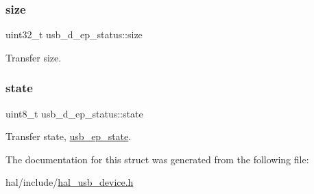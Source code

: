 \subsubsection{\texorpdfstring{size}{size}}
{\footnotesize\ttfamily uint32\+\_\+t usb\+\_\+d\+\_\+ep\+\_\+status\+::size}

Transfer size. \mbox{\label{structusb__d__ep__status_ac28adfc05f72116186906662394d8644}} 
\subsubsection{\texorpdfstring{state}{state}}
{\footnotesize\ttfamily uint8\+\_\+t usb\+\_\+d\+\_\+ep\+\_\+status\+::state}

Transfer state, \hyperlink{hpl__usb_8h_acc70a8353261a6e2e1e22ae668ace36a}{usb\+\_\+ep\+\_\+state}. 

The documentation for this struct was generated from the following file\+:\begin{DoxyCompactItemize}
\item 
hal/include/\hyperlink{hal__usb__device_8h}{hal\+\_\+usb\+\_\+device.\+h}\end{DoxyCompactItemize}
